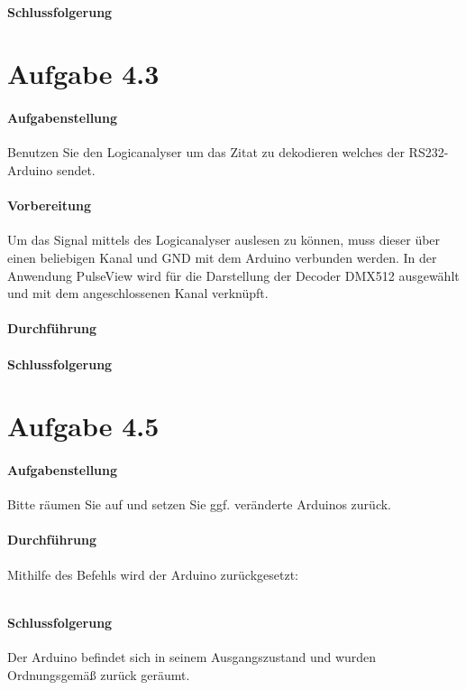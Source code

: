 \paragraph{Schlussfolgerung}


\section{Aufgabe 4.3}
\paragraph{Aufgabenstellung}
Benutzen Sie den Logicanalyser um das Zitat zu dekodieren welches der RS232-Arduino sendet.

\paragraph{Vorbereitung}
Um das Signal mittels des Logicanalyser auslesen zu können, muss dieser über einen beliebigen Kanal und GND mit dem Arduino verbunden werden. In der Anwendung PulseView wird für die Darstellung der Decoder DMX512 ausgewählt und mit dem angeschlossenen Kanal verknüpft.

\paragraph{Durchführung}


\paragraph{Schlussfolgerung}








\section{Aufgabe 4.5}
\paragraph{Aufgabenstellung}
Bitte räumen Sie auf und setzen Sie ggf. veränderte Arduinos zurück.

\paragraph{Durchführung}
Mithilfe des Befehls wird der Arduino zurückgesetzt:

\inputminted[breaklines, fontsize=\fontsize{10pt}{10pt}]{bash}{../docs/reset-dmx.txt}

\paragraph{Schlussfolgerung}
Der Arduino befindet sich in seinem Ausgangszustand und wurden Ordnungsgemäß zurück geräumt.